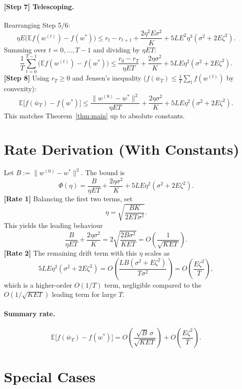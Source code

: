 \documentclass[11pt]{article}
\begin{document}
\paragraph{[Step 7] Telescoping.}
Rearranging Step 5/6:
\[
\eta E\big(\mathbb{E}f(w^{(t)})-f(w^*)\big)
\le r_t - r_{t+1} + \frac{2\eta^2 E\sigma^2}{K} + 5LE^2\eta^3(\sigma^2+2E\zeta^2).
\]
Summing over $t=0,\dots,T-1$ and dividing by $\eta E T$:
\[
\frac{1}{T}\sum_{t=0}^{T-1}\big(\mathbb{E}f(w^{(t)})-f(w^*)\big)
\le \frac{r_0 - r_T}{\eta E T}
+ \frac{2\eta\sigma^2}{K}
+ 5LE\eta^2(\sigma^2 + 2E\zeta^2).
\]
\textbf{[Step 8]} Using $r_T\ge0$ and Jensen's inequality
($f(\bar w_T)\le \frac1T\sum_t f(w^{(t)})$ by convexity):
\[
\boxed{\;
\mathbb{E}\big[f(\bar w_T)-f(w^*)\big]
\le \frac{\|w^{(0)}-w^*\|^2}{\eta E T}
+ \frac{2\eta\sigma^2}{K}
+ 5LE\eta^2(\sigma^2 + 2E\zeta^2).
\;}
\]
This matches Theorem~\ref{thm:main} up to absolute constants.

\section*{Rate Derivation (With Constants)}

Let $B := \|w^{(0)}-w^*\|^2$. The bound is
\[
\Phi(\eta) = \frac{B}{\eta E T} + \frac{2\eta\sigma^2}{K} + 5LE\eta^2(\sigma^2+2E\zeta^2).
\]
\textbf{[Rate 1]} Balancing the first two terms, set
\[
\eta = \sqrt{\frac{B K}{2 E T \sigma^2}} .
\]
This yields the leading behaviour
\[
\frac{B}{\eta E T} + \frac{2\eta\sigma^2}{K}
= 2\sqrt{\frac{2 B \sigma^2}{K E T}}
= O\!\left(\frac{1}{\sqrt{KET}}\right).
\]
\textbf{[Rate 2]} The remaining drift term with this $\eta$ scales as
\[
5LE\eta^2(\sigma^2+2E\zeta^2)
= O\!\left(\frac{L B (\sigma^2 + E\zeta^2)}{T\sigma^2}\right)
= O\!\left(\frac{E\zeta^2}{T}\right),
\]
which is a higher-order $O(1/T)$ term, negligible compared to the $O(1/\sqrt{KET})$
leading term for large $T$.

\paragraph{Summary rate.}
\[
\mathbb{E}\big[f(\bar w_T)-f(w^*)\big]
= O\!\left(\frac{\sqrt{B}\,\sigma}{\sqrt{KET}}\right)
+ O\!\left(\frac{E\zeta^2}{T}\right).
\]

\section*{Special Cases}
\end{document}
